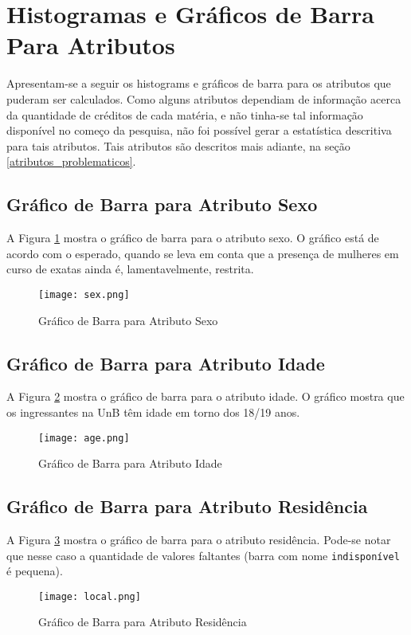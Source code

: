 \section{Histogramas e Gráficos de Barra Para Atributos}
Apresentam-se a seguir os histograms e gráficos de barra para os atributos que puderam
ser calculados. Como alguns atributos dependiam de informação acerca da quantidade de
créditos de cada matéria, e não tinha-se tal informação disponível no começo da
pesquisa, não foi possível gerar a estatística descritiva para tais atributos. Tais
atributos são descritos mais adiante, na seção \ref{atributos_problematicos}.

\subsection{Gráfico de Barra para Atributo Sexo}
A Figura \ref{atr_sex} mostra o gráfico de barra para o atributo sexo. O gráfico
está de acordo com o esperado, quando se leva em conta que a presença de mulheres em
curso de exatas ainda é, lamentavelmente, restrita. 
\begin{figure}[!ht]
    \caption{Gráfico de Barra para Atributo Sexo}
    \centering
    \texttt{[image: sex.png]}
    \label{atr_sex}
\end{figure}

\subsection{Gráfico de Barra para Atributo Idade}
A Figura \ref{atr_age} mostra o gráfico de barra para o atributo idade. O gráfico
mostra que os ingressantes na UnB têm idade em torno dos 18/19 anos. 
\begin{figure}[!ht]
    \caption{Gráfico de Barra para Atributo Idade}
    \centering
    \texttt{[image: age.png]}
    \label{atr_age}
\end{figure}

\subsection{Gráfico de Barra para Atributo Residência}
A Figura \ref{atr_res} mostra o gráfico de barra para o atributo residência. Pode-se
notar que nesse caso a quantidade de valores faltantes (barra com nome
\texttt{indisponível} é pequena). 
\begin{figure}[!ht]
    \caption{Gráfico de Barra para Atributo Residência}
    \centering
    \texttt{[image: local.png]}
    \label{atr_res}
\end{figure}
\clearpage


